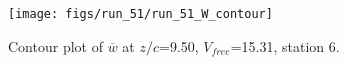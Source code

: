 \begin{figure}[H]
\centering
\texttt{[image: figs/run\_51/run\_51\_W\_contour]}
\caption{Contour plot of $\overline{w}$ at $z/c$=9.50, $V_{free}$=15.31, station 6.}
\end{figure}


